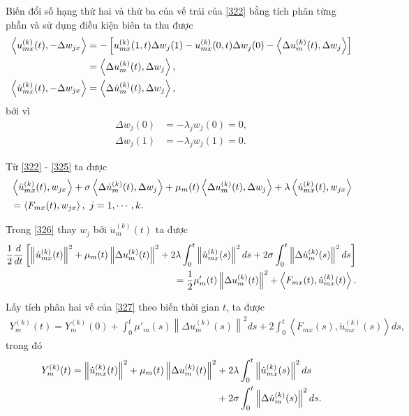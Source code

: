 \documentclass[12pt,a4paper]{article}
\theoremstyle{definition}
\theoremstyle{definition}
\begin{document}
Biến đổi số hạng thứ hai và thứ ba của vế trái của \eqref{322} bằng tích phân từng phần và sử dụng điều kiện biên ta thu được
\begin{align} \label{325}
    \left< u_{mx}^{(k)}(t), -\Delta w_{jx}\right>
    &= -\left[u_{mx}^{(k)}(1,t) \Delta w_j(1) - u_{mx}^{(k)}(0,t) \Delta w_j(0) - \left<\Delta u_m^{(k)}(t), \Delta w_j\right>\right] \\
    &= \left<\Delta u_m^{(k)}(t), \Delta w_j\right>, \notag \\
    \left< \dot{u}_{mx}^{(k)}(t), -\Delta w_{jx}\right> &= \left<\Delta \dot{u}_m^{(k)}(t), \Delta w_j\right>, \notag
\end{align}
bởi vì
\begin{align*}
    \Delta w_j(0) &= -\lambda_j w_j(0) = 0, \\
    \Delta w_j(1) &= -\lambda_j w_j(1) = 0.
\end{align*}

Từ \eqref{322} - \eqref{325} ta được
\begin{align} \label{326}
    &\left< \ddot{u}_{mx}^{(k)}(t), w_{jx} \right>
    + \sigma \left< \Delta \dot{u}_m^{(k)}(t), \Delta w_j \right>
    + \mu_m(t) \left< \Delta u_m^{(k)}(t), \Delta w_j \right>
    + \lambda \left< \dot{u}_{mx}^{(k)}(t), w_{jx} \right> \\
    &= \left< F_{mx}(t), w_{jx}\right>, \  j = 1,\cdots,k. \notag
\end{align}

Trong \eqref{326} thay $w_j$ bởi $\dot{u}_m^{(k)}(t)$ ta được
\begin{align} \label{327}
    \frac{1}{2} \frac{d}{dt} \left[ \left\|\dot{u}_{mx}^{(k)}(t)\right\|^2 + \mu_m(t) \left\|\Delta u_m^{(k)}(t)\right\|^2 + 2 \lambda \int_0^t \left\|\dot{u}_{mx}^{(k)}(s)\right\|^2 ds + 2 \sigma \int_0^t \left\|\Delta \dot{u}_m^{(k)}(s)\right\|^2 ds\right] \notag \\
    = \frac{1}{2} \mu'_m(t) \left\|\Delta u_m^{(k)}(t)\right\|^2 + \left< F_{mx}(t), \dot{u}_{mx}^{(k)}(t)\right>.
\end{align}

Lấy tích phân hai vế của \eqref{327} theo biến thời gian $t$, ta được
\begin{align}
    Y_m^{(k)}(t) = Y_m^{(k)}(0)
    + \int_0^t \mu'_m(s) \left\|\Delta u_m^{(k)}(s)\right\|^2 ds
    + 2 \int_0^t \left< F_{mx}(s), \dot{u}_{mx}^{(k)}(s)\right> ds,
\end{align}
trong đó
\begin{align}
    Y_m^{(k)}(t) = \left\|\dot{u}_{mx}^{(k)}(t)\right\|^2 + \mu_m(t) \left\|\Delta u_m^{(k)}(t)\right\|^2 &+ 2 \lambda \int_0^t \left\|\dot{u}_{mx}^{(k)}(s)\right\|^2 ds \\
    &+ 2 \sigma \int_0^t \left\|\Delta \dot{u}_m^{(k)}(s)\right\|^2 ds. \notag
\end{align}
\end{document}
